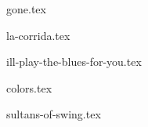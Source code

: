 \begin{songs}{}

  {gone.tex}
  \sclearpage

  {la-corrida.tex}
  \sclearpage

  {ill-play-the-blues-for-you.tex}
  \sclearpage

  {colors.tex}
  \sclearpage

  {sultans-of-swing.tex}
  \sclearpage

 \end{songs}
